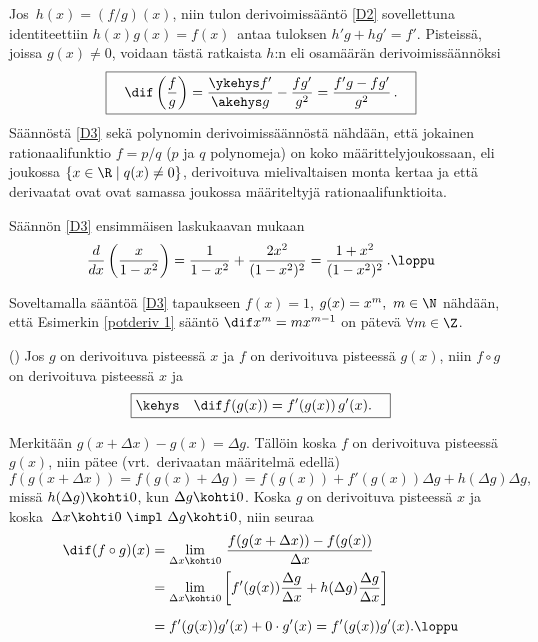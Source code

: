 Jos $\,h(x)=(f/g)(x)$, niin tulon derivoimissääntö \eqref{D2} sovellettuna identiteettiin
$h(x)g(x)=f(x)\,$ antaa tuloksen $h'g+hg'=f'$. Pisteissä, joissa $g(x) \neq 0$, voidaan tästä
ratkaista $h$:n eli osamäärän derivoimissäännöksi
\begin{equation} \label{D3}
\boxed{\quad \dif\left(\frac{f}{g}\right)
           =\frac{\ykehys f'}{\akehys g}-\frac{fg'}{g^2}=\frac{f'g-fg'}{g^2}\,. \quad}
\end{equation}
Säännöstä \eqref{D3} sekä polynomin derivoimissäännöstä nähdään, että jokainen
rationaalifunktio $f=p/q$ ($p$ ja $q$ polynomeja) on koko määrittelyjoukossaan, eli joukossa
$\{x\in\R \mid q(x) \neq 0\}$, derivoituva mielivaltaisen monta kertaa ja että derivaatat ovat
ovat samassa joukossa määriteltyjä rationaalifunktioita.
\begin{Exa} \label{ratfunktion derivaatta} Säännön \eqref{D3} ensimmäisen laskukaavan mukaan
\[
\frac{d}{dx}\left(\frac{x}{1-x^2}\right) = \frac{1}{1-x^2}+\frac{2x^2}{(1-x^2)^2}
                                         = \frac{1+x^2}{(1-x^2)^2}\,. \loppu
\]
\end{Exa}
\begin{Exa} \label{potder 2} Soveltamalla sääntöä \eqref{D3} tapaukseen $f(x)=1$,
$g(x)=x^m,\ m\in\N$ nähdään, että Esimerkin \ref{potderiv 1} sääntö $\dif x^m = mx^{m-1}$ on
pätevä $\forall m\in\Z$. \loppu
\end{Exa}
\begin{Lause} () \label{yhdistetyn funktion derivaatta}
% 
Jos $g$ on derivoituva pisteessä $x$ ja $f$ on derivoituva pisteessä $g(x)$, niin $f \circ g$
on derivoituva pisteessä $x$ ja
\[
\boxed{\kehys\quad \dif f(g(x))=f'(g(x))\,g'(x). \quad}
\]
\end{Lause}
\tod Merkitään $g(x+\Delta x)-g(x)=\Delta g$. Tällöin koska $f$ on derivoituva
pisteessä $g(x)$, niin pätee (vrt.\ derivaatan määritelmä edellä)
\[
f(g(x+\Delta x)) = f(g(x)+\Delta g) = f(g(x))+f'(g(x))\Delta g + h(\Delta g)\Delta g,
\]
missä $h(\Delta g) \kohti 0$, kun $\Delta g \kohti 0$. Koska $g$ on derivoituva pisteessä
$x$ ja koska $\,\Delta x \kohti 0\ \impl\ \Delta g \kohti 0$, niin seuraa
\begin{align*}
\dif (f\circ g)(x) &= \lim_{\Delta x \kohti 0}\,\frac{f(g(x+\Delta x))-f(g(x))}{\Delta x} \\
                   &= \lim_{\Delta x \kohti 0} \left[f'(g(x))\frac{\Delta g}{\Delta x} 
                                     + h(\Delta g)\frac{\Delta g}{\Delta x}\right] \\[2mm]
                   &= f'(g(x))g'(x) + 0 \cdot g'(x) = f'(g(x))g'(x). \loppu
\end{align*}

